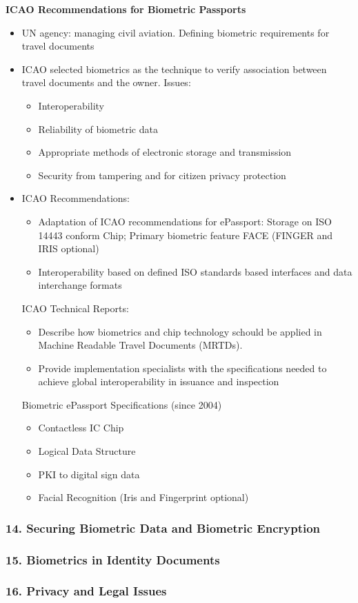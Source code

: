 \documentclass[a4paper]{article}
\begin{document}
      \textbf{ICAO Recommendations for Biometric Passports}
      \begin{itemize}
        \item UN agency: managing civil aviation. Defining biometric requirements for travel documents
        \item ICAO selected biometrics as the technique to verify association between travel documents and the owner. Issues:
        \begin{itemize}
          \item Interoperability
          \item Reliability of biometric data
          \item Appropriate methods of electronic storage and transmission
          \item Security from tampering and for citizen privacy protection
        \end{itemize}
        \item ICAO Recommendations:
        \begin{itemize}
          \item Adaptation of ICAO recommendations for ePassport: Storage on ISO 14443 conform Chip; Primary biometric feature FACE (FINGER and IRIS optional)
          \item Interoperability based on defined ISO standards based interfaces and data
          interchange formats
        \end{itemize}
        ICAO Technical Reports:
        \begin{itemize}
          \item Describe how biometrics and chip technology schould be applied in Machine Readable
          Travel Documents (MRTDs).
          \item Provide implementation specialists with the specifications needed to achieve global interoperability in issuance and inspection
        \end{itemize}

        Biometric ePassport Specifications (since 2004)
        \begin{itemize}
          \item Contactless IC Chip
          \item Logical Data Structure
          \item PKI to digital sign data
          \item Facial Recognition (Iris and Fingerprint optional)
        \end{itemize}
      \end{itemize}
    \subsubsection*{14. Securing Biometric Data and Biometric Encryption}
    \subsubsection*{15. Biometrics in Identity Documents}
    \subsubsection*{16. Privacy and Legal Issues}
\end{document}
